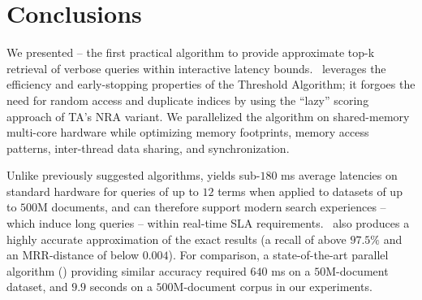\section{Conclusions}
\label{sec:conclusions}

We presented \alg\/ -- the first practical algorithm to provide 
approximate top-k retrieval of verbose queries within interactive latency bounds.
\alg\ leverages the efficiency and early-stopping properties of the Threshold Algorithm; it forgoes the need for random access
and duplicate indices by using the ``lazy'' scoring approach of TA's NRA variant. We
parallelized the algorithm on shared-memory multi-core hardware while 
optimizing memory footprints, memory access 
patterns, inter-thread data sharing, and synchronization.  

Unlike previously suggested algorithms, \alg\/ yields sub-$180$ ms average latencies on standard hardware
for queries of up to $12$ terms when applied to datasets of up to $500$M documents, and 
can therefore support modern search experiences -- which induce long queries --
within real-time SLA requirements.  
\alg\ also produces a highly accurate approximation of the exact results (a recall of above 
$97.5\%$ and an MRR-distance of below $0.004$). 
For comparison, 
a state-of-the-art parallel algorithm (\pBMW) providing similar accuracy required $640$ ms on a $50$M-document dataset, 
and  $9.9$ seconds on a $500$M-document corpus in our experiments. 


